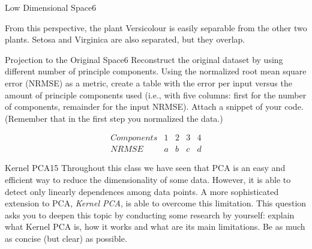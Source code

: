 \begin{questions}
\begin{question}{Low Dimensional Space}{6}
\begin{answer}
From this perspective, the plant Versicolour is easily separable from the other two plants. Setosa and Virginica are also separated, but they overlap.

\end{answer}

\end{question}


\begin{question}{Projection to the Original Space}{6}
Reconstruct the original dataset by using different number of principle components. Using the normalized root mean square error (NRMSE) as a metric, create a table with the error per input versus the amount of principle components used (i.e., with five columns: first for the number of components, remainder for the input NRMSE).
Attach a snippet of your code.
(Remember that in the first step you normalized the data.)


\begin{answer}


\[\begin{array}{lcccc}
	Components & 1 & 2 & 3 & 4 \\ 
	NRMSE & a & b & c & d
\end{array} 
\]
	
\end{answer}
\end{question}

\begin{question}[bonus]{Kernel PCA}{15}
Throughout this class we have seen that PCA is an easy and efficient way to reduce the dimensionality of some data. However, it is able to detect only linearly dependences among data points. A more sophisticated extension to PCA, \emph{Kernel PCA}, is able to overcome this limitation. 
This question asks you to deepen this topic by conducting some research by yourself: explain what Kernel PCA is, how it works and what are its main limitations. Be as much as concise (but clear) as possible.

\begin{answer}\end{answer}

\end{question}

\end{questions}
